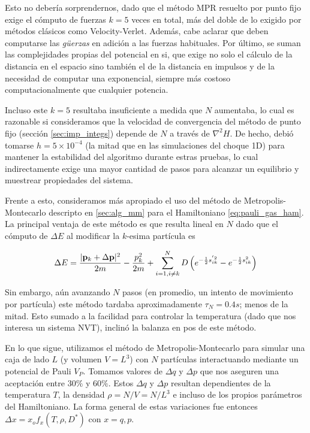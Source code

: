 Esto no debería sorprendernos, dado que el método MPR resuelto por punto fijo exige el cómputo de fuerzas $k=5$ veces en total, más del doble de lo exigido por métodos clásicos como Velocity-Verlet.
Además, cabe aclarar que deben computarse las \textit{güerzas} en adición a las fuerzas habituales.
Por último, se suman las complejidades propias del potencial en si, que exige no solo el cálculo de la distancia en el espacio sino también el de la distancia en impulsos y de la necesidad
de computar una exponencial, siempre más costoso computacionalmente que cualquier potencia.

Incluso este $k=5$ resultaba insuficiente a medida que $N$ aumentaba, lo cual es razonable si consideramos que la velocidad de convergencia del método de punto fijo (sección \ref{sec:imp_integs})
depende de $N$ a través de $\nabla^2H$.
De hecho, debió tomarse $h=5\times10^{-4}$ (la mitad que en las simulaciones del choque 1D) para mantener la estabilidad del algoritmo durante estras pruebas, lo cual indirectamente exige una
mayor cantidad de pasos para alcanzar un equilibrio y muestrear propiedades del sistema.

Frente a esto, consideramos más apropiado el uso del método de Metropolis-Montecarlo descripto en \ref{sec:alg_mm} para el Hamiltoniano \eqref{eq:pauli_gas_ham}.
La principal ventaja de este método es que resulta lineal en $N$ dado que el cómputo de $\Delta E$ al modificar la $k$-esima partícula es

\begin{equation}{\label{eq:delta_E}}
 \Delta E =  \frac{|\mathbf{p}_k + \Delta \mathbf{p}|^2}{2m} - \frac{p_k^2}{2m} + \sum_{i=1, i\neq k}^N D\left( e^{-\frac{1}{2}s_{ik}^{'2}}-e^{-\frac{1}{2}s_{ik}^2}  \right)
\end{equation}

Sin embargo, aún avanzando $N$ pasos (en promedio, un intento de movimiento por partícula) este método tardaba aproximadamente $\tau_N = 0.4s$; menos de la mitad.
Esto sumado a la facilidad para controlar la temperatura (dado que nos interesa un sistema NVT), inclinó la balanza en pos de este método.

En lo que sigue, utilizamos el método de Metropolis-Montecarlo para simular una caja de lado $L$ (y volumen $V=L^3$) con $N$ partículas interactuando mediante un potencial de Pauli $V_P$.
Tomamos valores de $\Delta q$ y $\Delta p$ que nos aseguren una aceptación entre $30\%$ y $60\%$.
Estos $\Delta q$ y $\Delta p$ resultan dependientes de la temperatura $T$, la densidad $\rho = N/V = N/L^3$ e incluso de los propios parámetros del Hamiltoniano.
La forma general de estas variaciones fue entonces $\Delta x = x_o f_x(T, \rho, D^*)$  con $x=q,p$.

